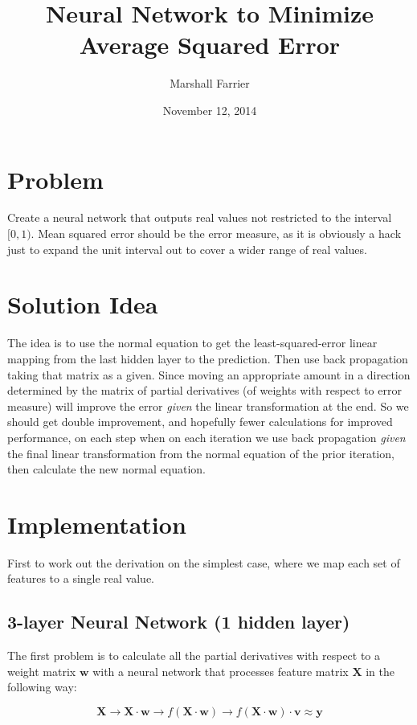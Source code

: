 \documentclass[11pt, oneside]{article}   	%
\title{Neural Network to Minimize Average Squared Error}
\author{Marshall Farrier}
\date{November 12, 2014}							%
\begin{document}
\maketitle
\section{Problem}
Create a neural network that outputs real values not restricted to the interval $[0, 1)$. Mean squared error should be the error measure, as it is obviously a hack just to expand the unit interval out to cover a wider range of real values.

\section{Solution Idea}
The idea is to use the normal equation to get the least-squared-error linear mapping from the last hidden layer to the prediction. Then use back propagation taking that matrix as a given. Since moving an appropriate amount in a direction determined by the matrix of partial derivatives (of weights with respect to error measure) will improve the error \textit{given} the linear transformation at the end. So we should get double improvement, and hopefully fewer calculations for improved performance, on each step when on each iteration we use back propagation \textit{given} the final linear transformation from the normal equation of the prior iteration, then calculate the new normal equation.

\section{Implementation}

First to work out the derivation on the simplest case, where we map each set of features to a single real value.

\subsection{3-layer Neural Network (1 hidden layer)}

The first problem is to calculate all the partial derivatives with respect to a weight matrix $\textbf{w}$ with a neural network that processes feature matrix $\textbf{X}$ in the following way:

\begin{equation}
\textbf{X} \rightarrow \textbf{X} \cdot \textbf{w} \rightarrow f(\textbf{X} \cdot \textbf{w}) 
\rightarrow f(\textbf{X} \cdot \textbf{w}) \cdot \textbf{v} \approx \textbf{y}
\end{equation}
\end{document}
